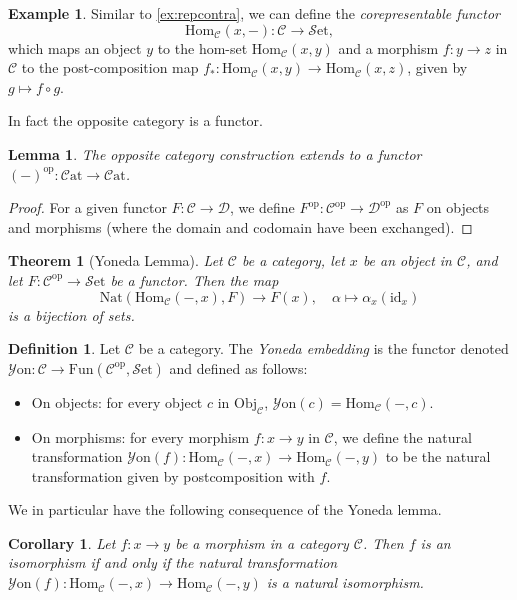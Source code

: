 \documentclass[11pt, a4paper]{amsart}
\newcommand{\cC}{\mathcal{C}}
\newcommand{\cD}{\mathcal{D}}
\newcommand{\Hom}{\mathrm{Hom}}
\newcommand{\op}{\mathrm{op}}
\newcommand{\Fun}{\mathrm{Fun}}
\newcommand{\Nat}{\mathrm{Nat}}
\newcommand{\Set}{\mathscr{S}\mathrm{et}}
\newcommand{\Yon}{\mathscr{Y}\mathrm{on}}
\newcommand{\Cat}{\mathscr{C}\mathrm{at}}
\newcommand{\id}{\mathrm{id}}
\newcommand{\Obj}{\mathrm{Obj}}
\newtheorem{theorem}[equation]{Theorem}
\newtheorem{lemma}[equation]{Lemma}
\newtheorem{corollary}[equation]{Corollary}
\theoremstyle{definition}
\newtheorem{definition}[equation]{Definition}
\newtheorem{example}[equation]{Example}
\theoremstyle{remark}
\numberwithin{equation}{section}
\begin{document}
\begin{example}
 Similar to \cref{ex:repcontra}, we can define the \emph{corepresentable functor} 
 \[\Hom_{\cC}(x,-)\colon \cC \to \Set,\] 
 which maps an object $y$ to the hom-set $\Hom_{\cC}(x,y)$ and a morphism $f\colon y \to z$ in $\cC$ to the post-composition map $f_* \colon \Hom_{\cC}(x,y) \to \Hom_{\cC}(x,z)$, given by $g \mapsto f \circ g$.
\end{example}

In fact the opposite category is a functor.

\begin{lemma} \label{lemma:opposite functor}
  The opposite category construction extends to a functor $(-)^{\op}\colon \Cat \to \Cat$.
\end{lemma}

\begin{proof}
  For a given functor $F\colon \cC \to \cD$, we define $F^{\op}\colon \cC^{\op} \to \cD^{\op}$ as $F$ on objects and morphisms (where the domain and codomain have been exchanged).
\end{proof}

\begin{theorem}[Yoneda Lemma] \label{thm:yoneda}
	Let $\cC$ be a category, let $x$ be an object in $\cC$, and let $F\colon \cC^{\op} \to \Set$ be a functor. Then the map
	\[
 \Nat(\Hom_{\cC}(-,x),F) \to F(x), \quad \alpha \mapsto \alpha_x(\id_x)
	\]
  is a bijection of sets.
\end{theorem}

\begin{definition} \label{def:yoneda embedding}
  Let $\cC$ be a category. The \emph{Yoneda embedding} is the functor denoted $\Yon\colon\cC \to \Fun(\cC^{\op},\Set)$ and defined as follows:
  \begin{itemize}
   \item On objects: for every object $c$ in $\Obj_{\cC}$, $\Yon(c) = \Hom_{\cC}(-,c)$.
   \item On morphisms: for every morphism $f\colon x \to y$ in $\cC$, we define the natural transformation $\Yon(f)\colon \Hom_{\cC}(-,x) \to \Hom_{\cC}(-,y)$ to be the natural transformation given by postcomposition with $f$.
  \end{itemize}
\end{definition}

We in particular have the following consequence of the Yoneda lemma.

\begin{corollary} \label{cor:iso iff natural iso}
  Let $f \colon x \to y$ be a morphism in a category $\cC$. Then $f$ is an isomorphism if and only if the natural transformation $\Yon(f)\colon \Hom_{\cC}(-,x) \to \Hom_{\cC}(-,y)$ is a natural isomorphism. 
\end{corollary}
\end{document}
